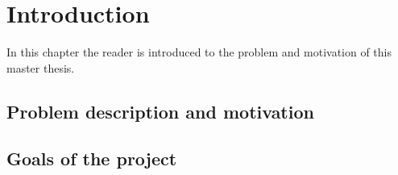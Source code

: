 \chapter{Introduction}
\label{cha:Introduction}

In this chapter the reader is introduced to the problem and motivation of this master thesis.

\section{Problem description and motivation}

\section{Goals of the project}



